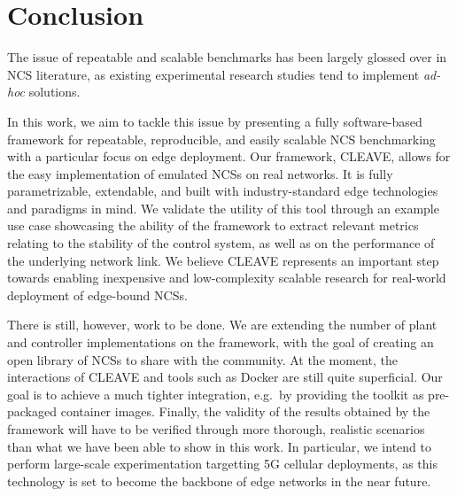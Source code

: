 \section{Conclusion}\label{sec:conclusion}

The issue of repeatable and scalable benchmarks has been largely glossed over in \ac{NCS} literature, as existing experimental research studies tend to implement \emph{ad-hoc} solutions.

In this work, we aim to tackle this issue by presenting a fully software-based framework for repeatable, reproducible, and easily scalable \ac{NCS} benchmarking with a particular focus on edge deployment.
Our framework, \ac{CLEAVE}, allows for the easy implementation of emulated \acp{NCS} on real networks.
It is fully parametrizable, extendable, and built with industry-standard edge technologies and paradigms in mind.
We validate the utility of this tool through an example use case showcasing the ability of the framework to extract relevant metrics relating to the stability of the control system, as well as on the performance of the underlying network link.
We believe \ac{CLEAVE} represents an important step towards enabling inexpensive and low-complexity scalable research for real-world deployment of edge-bound \acp{NCS}.

There is still, however, work to be done.
We are extending the number of plant and controller implementations on the framework, with the goal of creating an open library of \acp{NCS} to share with the community.
At the moment, the interactions of \ac{CLEAVE} and tools such as Docker are still quite superficial.
Our goal is to achieve a much tighter integration, e.g.\ by providing the toolkit as pre-packaged container images.
Finally, the validity of the results obtained by the framework will have to be verified through more thorough, realistic scenarios than what we have been able to show in this work.
In particular, we intend to perform large-scale experimentation targetting 5G cellular deployments, as this technology is set to become the backbone of edge networks in the near future.
